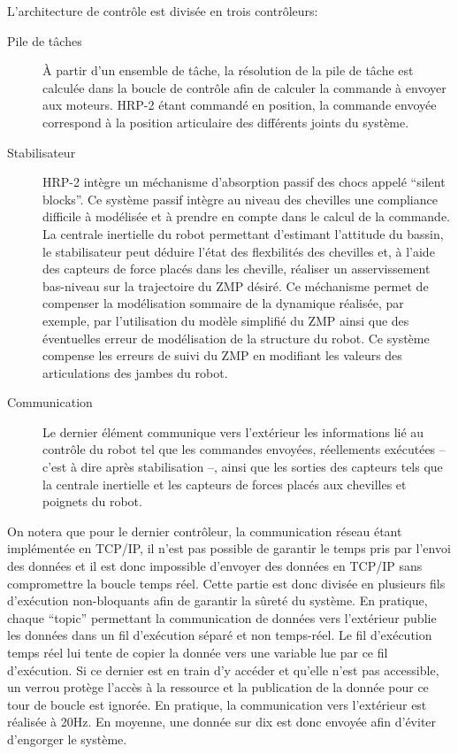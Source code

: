 L'architecture de contrôle est divisée en trois contrôleurs:
\begin{description}
\item[Pile de tâches] À partir d'un ensemble de
  tâche, la résolution de la pile de tâche est calculée dans la boucle
  de contrôle afin de calculer la commande à envoyer aux
  moteurs. HRP-2 étant commandé en position, la commande envoyée
  correspond à la position articulaire des différents joints du
  système.
\item[Stabilisateur] HRP-2 intègre un méchanisme
  d'absorption passif des chocs appelé ``silent blocks''. Ce système passif intègre au niveau des chevilles une
  compliance difficile à modélisée et à prendre en compte dans le
  calcul de la commande. La centrale inertielle du robot permettant
  d'estimant l'attitude du bassin, le stabilisateur peut déduire
  l'état des flexbilités des chevilles et, à l'aide des capteurs de
  force placés dans les cheville, réaliser un asservissement
  bas-niveau sur la trajectoire du ZMP désiré. Ce méchanisme permet de
  compenser la modélisation sommaire de la dynamique réalisée, par
  exemple, par l'utilisation du modèle simplifié du ZMP ainsi que des
  éventuelles erreur de modélisation de la structure du robot. Ce
  système compense les erreurs de suivi du ZMP en modifiant les
  valeurs des articulations des jambes du robot.
\item[Communication] Le dernier élément communique vers l'extérieur
  les informations lié au contrôle du robot tel que les commandes
  envoyées, réellements exécutées -- c'est à dire après stabilisation
  --, ainsi que les sorties des capteurs tels que la centrale
  inertielle et les capteurs de forces placés aux chevilles et
  poignets du robot.
\end{description}


On notera que pour le dernier contrôleur, la communication réseau
étant implémentée en TCP/IP, il n'est pas possible de
garantir le temps pris par l'envoi des données et il est donc
impossible d'envoyer des données en TCP/IP sans
compromettre la boucle temps réel. Cette partie est donc divisée en
plusieurs fils d'exécution non-bloquants afin de garantir la sûreté du
système. En pratique, chaque ``topic'' permettant la communication de
données vers l'extérieur publie les données dans un fil d'exécution
séparé et non temps-réel. Le fil d'exécution
temps réel lui tente de copier la donnée vers une variable lue par ce
fil d'exécution. Si ce dernier est en train d'y accéder et qu'elle
n'est pas accessible, un verrou protège l'accès à la ressource et la
publication de la donnée pour ce tour de boucle est ignorée. En
pratique, la communication vers l'extérieur est réalisée à 20Hz. En
moyenne, une donnée sur dix est donc envoyée afin d'éviter d'engorger
le système.


